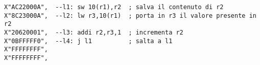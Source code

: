 
\begin{lstlisting}
X"AC22000A",  --l1: sw 10(r1),r2  ; salva il contenuto di r2
X"8C23000A",  --l2: lw r3,10(r1)  ; porta in r3 il valore presente in r2
X"20620001",  --l3: addi r2,r3,1  ; incrementa r2
X"0BFFFFF0",  --l4: j l1          ; salta a l1
X"FFFFFFFF",
X"FFFFFFFF",

\end{lstlisting} 
